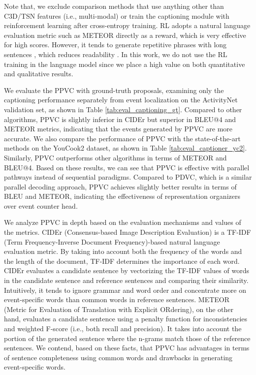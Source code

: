 Note that, we exclude comparison methods that use anything other than C3D/TSN features (i.e., multi-modal) or train the captioning module with reinforcement learning after cross-entropy training.
RL adopts a natural language evaluation metric such as METEOR directly as a reward, which is very effective for high scores. 
However, it tends to generate repetitive phrases with long sentences \cite{wang2019describing}, which reduces readability \cite{wang2018bidirectional,fujita2020soda}.
In this work, we do not use the RL training in the language model since we place a high value on both quantitative and qualitative results.

We evaluate the PPVC with ground-truth proposals, examining only the captioning performance separately from event localization on the ActivityNet validation set, as shown in Table \ref{tab:eval_captioning_gt}.
Compared to other algorithms, PPVC is slightly inferior in CIDEr but superior in BLEU@4 and METEOR metrics, indicating that the events generated by PPVC are more accurate.
We also compare the performance of PPVC with the state-of-the-art methods on the YouCook2 dataset, as shown in Table \ref{tab:eval_captioner_yc2}.
Similarly, PPVC outperforms other algorithms in terms of METEOR and BLEU@4.
Based on these results, we can see that PPVC is effective with parallel pathways instead of sequential paradigms.
Compared to PDVC, which is a similar parallel decoding approach, PPVC achieves slightly better results in terms of BLEU and METEOR, indicating the effectiveness of representation organizers over event counter head.

We analyze PPVC in depth based on the evaluation mechanisms and values of the metrics.
CIDEr (Consensus-based Image Description Evaluation) is a TF-IDF (Term Frequency-Inverse Document Frequency)-based natural language evaluation metric.
By taking into account both the frequency of the words and the length of the document, TF-IDF determines the importance of each word.
CIDEr evaluates a candidate sentence by vectorizing the TF-IDF values of words in the candidate sentence and reference sentences and comparing their similarity.
Intuitively, it tends to ignore grammar and word order and concentrate more on event-specific words than common words in reference sentences.
METEOR (Metric for Evaluation of Translation with Explicit ORdering), on the other hand, evaluates a candidate sentence using a penalty function for inconsistencies and weighted F-score (i.e., both recall and precision).
It takes into account the portion of the generated sentence where the n-grams match those of the reference sentences.
We contend, based on these facts, that PPVC has advantages in terms of sentence completeness using common words and drawbacks in generating event-specific words.

